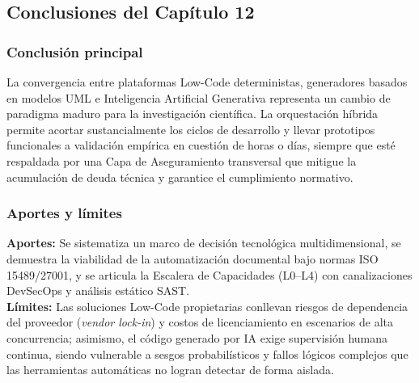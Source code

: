 \subsection*{Conclusiones del Capítulo 12}

\subsubsection*{Conclusión principal}
La convergencia entre plataformas Low-Code deterministas, generadores basados en modelos UML e Inteligencia Artificial Generativa representa un cambio de paradigma maduro para la investigación científica. La orquestación híbrida permite acortar sustancialmente los ciclos de desarrollo y llevar prototipos funcionales a validación empírica en cuestión de horas o días, siempre que esté respaldada por una Capa de Aseguramiento transversal que mitigue la acumulación de deuda técnica y garantice el cumplimiento normativo.

\subsubsection*{Aportes y límites}
\textbf{Aportes:} Se sistematiza un marco de decisión tecnológica multidimensional, se demuestra la viabilidad de la automatización documental bajo normas ISO 15489/27001, y se articula la Escalera de Capacidades (L0--L4) con canalizaciones DevSecOps y análisis estático SAST.\\[0.1cm]
\textbf{Límites:} Las soluciones Low-Code propietarias conllevan riesgos de dependencia del proveedor (\textit{vendor lock-in}) y costos de licenciamiento en escenarios de alta concurrencia; asimismo, el código generado por IA exige supervisión humana continua, siendo vulnerable a sesgos probabilísticos y fallos lógicos complejos que las herramientas automáticas no logran detectar de forma aislada.

